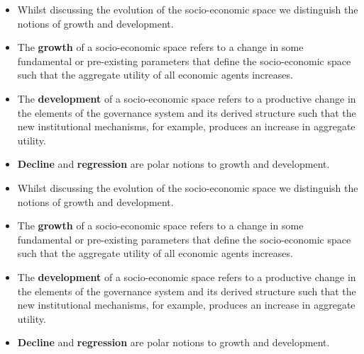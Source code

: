 \documentclass[9pt]{beamer}
\begin{document}
\begin{frame} %
\begin{itemize}
\item Whilst discussing the evolution of the socio-economic space we distinguish the notions of growth and development.
\medskip
\item The \textbf{growth} of a socio-economic space refers to a change in some fundamental or pre-existing parameters that define the socio-economic space such that the aggregate utility of all economic agents increases.
\medskip
\item The \textbf{development} of a socio-economic space refers to a productive change in the elements of the governance system and its derived structure such that the new institutional mechanisms, for example, produces an increase in aggregate utility.
\medskip
\item \textbf{Decline} and \textbf{regression} are polar notions to growth and development.
\end{itemize}
\end{frame}

\begin{frame} %
\begin{itemize}
\item Whilst discussing the evolution of the socio-economic space we distinguish the notions of growth and development.
\medskip
\item The \textbf{growth} of a socio-economic space refers to a change in some fundamental or pre-existing parameters that define the socio-economic space such that the aggregate utility of all economic agents increases.
\medskip
\item The \textbf{development} of a socio-economic space refers to a productive change in the elements of the governance system and its derived structure such that the new institutional mechanisms, for example, produces an increase in aggregate utility.
\medskip
\item \textbf{Decline} and \textbf{regression} are polar notions to growth and development.
\end{itemize}
\end{frame}
\end{document}
